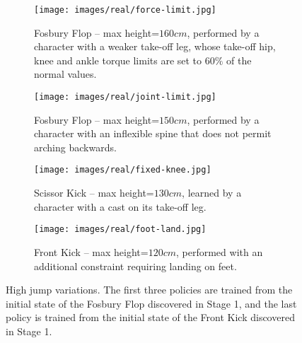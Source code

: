\begin{figure}
    \centering
    \begin{subfigure}[b]{0.99\linewidth}
        \texttt{[image: images/real/force-limit.jpg]}
        \caption{Fosbury Flop -- max height=$160cm$, performed by a character with a weaker take-off leg, whose take-off hip, knee and ankle torque limits are set to $60\%$ of the normal values.}
        \label{fig:variation-weakerLeg}
    \end{subfigure}
    \begin{subfigure}[b]{0.99\linewidth}
        \texttt{[image: images/real/joint-limit.jpg]}
        \caption{Fosbury Flop -- max height=$150cm$, performed by a character with an inflexible spine that does not permit arching backwards.}
        \label{fig:variation-inflexibleSpine}
    \end{subfigure}
    \begin{subfigure}[b]{0.99\linewidth}
        \texttt{[image: images/real/fixed-knee.jpg]}
        \caption{Scissor Kick -- max height=$130cm$, learned by a character with a cast on its take-off leg.}
        \label{fig:variation-fixedKnee}
    \end{subfigure}
    \begin{subfigure}[b]{0.99\linewidth}
    \texttt{[image: images/real/foot-land.jpg]}
    \caption{Front Kick -- max height=$120cm$, performed with an additional constraint requiring landing on feet.}
    \label{fig:variation-landonFoot}
    \end{subfigure}
    \caption{High jump variations. The first three policies are trained from the initial state of the Fosbury Flop discovered in Stage 1, and the last policy is trained from the initial state of the Front Kick discovered in Stage 1.}
    \label{fig:variations}
\end{figure}
